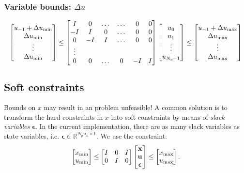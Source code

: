 \documentclass[a4paper,12pt,fleqn]{article}
\newcommand{\nx}{n_x}
\newcommand{\varepsvec}{\bm{\epsilon}}
\newcommand{\varxvec}{\mathbf{x}}
\newcommand{\varuvec}{\mathbf{u}}
\newcommand{\Np}{{N_p}}
\newcommand{\Nc}{{N_c}}
\begin{document}
\subsubsection{Variable bounds: $\Delta u$}
\begin{equation}
\begin{bmatrix}
u_{-1} +\Delta u_{\rm min}\\
\Delta u_{\rm min}\\
\vdots\\
\Delta u_{\rm min}\\
\end{bmatrix} \leq 
\begin{bmatrix}
  I  &  0 & \dots & \dots  & 0 & 0\\
 -I  &  I &  0    & \dots  & 0 & 0\\
  0  & -I &  I    & \dots  & 0 & 0\\
	\vdots\\
	0  &  0 & \dots & 0      &-I & I\\    
\end{bmatrix}
\begin{bmatrix}
u_0\\
u_1\\
\vdots\\
u_{\Nc-1}\\
\end{bmatrix}
\leq 
\begin{bmatrix}
u_{-1} +\Delta u_{\rm max}\\
\Delta u_{\rm max}\\
\vdots\\
\Delta u_{\rm max}\\
\end{bmatrix}
\end{equation}

\subsection{Soft constraints}
Bounds on $x$ may result in an problem unfeasible! A common solution
is to transform the hard constraints in $x$ into soft constraints by means of  \emph{slack variables} $\varepsvec$. 
In the current implementation, there are as many slack variables as state variables, i.e. $\varepsvec \in \mathbb{R}^{\Np\nx \times 1}$.
We use the constraint:
\begin{equation}
\begin{bmatrix}
 x_{\rm min}\\u_{\rm min}
\end{bmatrix}
\leq
\begin{bmatrix}
 I &0 &I\\
 0 &I & 0
\end{bmatrix}
\begin{bmatrix}
 \varxvec\\
 \varuvec\\
 \varepsvec
\end{bmatrix}
\leq
\begin{bmatrix}
 x_{\rm max}\\u_{\rm max}
\end{bmatrix}.
\end{equation}
\end{document}
